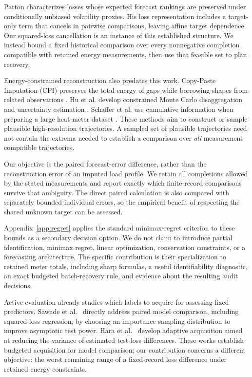 \documentclass[12pt]{article}
\begin{document}
Patton \cite{patton} characterizes losses whose expected forecast rankings
are preserved under conditionally unbiased volatility proxies. His loss
representation includes a target-only term that cancels in pairwise
comparisons, leaving affine target dependence. Our squared-loss cancellation
is an instance of this established structure. We instead bound a fixed
historical comparison over every nonnegative completion compatible with
retained energy measurements, then use that feasible set to plan recovery.

Energy-constrained reconstruction also predates this work. Copy-Paste
Imputation (CPI) preserves the total energy of gaps while borrowing shapes
from related observations \cite{cpi}. Hu et al. develop constrained Monte
Carlo disaggregation and uncertainty estimation \cite{hu}. Schaffer et al.
use cumulative information when preparing a large heat-meter dataset
\cite{heat}. These methods aim to construct or sample plausible high-resolution
trajectories. A sampled set of plausible trajectories need not contain the
extrema needed to establish a comparison over \emph{all} measurement-compatible
trajectories.

Our objective is the paired forecast-error difference, rather than the
reconstruction error of an imputed load profile. We retain all completions
allowed by the stated measurements and report exactly which finite-record
comparisons survive that ambiguity. The direct paired calculation is also
compared with separately bounded individual errors, so the empirical benefit
of respecting the shared unknown target can be assessed.

Appendix~\ref{app:regret} applies the standard minimax-regret criterion
\cite{savage,manskiregret} to these bounds as a secondary decision option.
We do not claim to introduce partial identification, minimax regret, linear
optimization, conservation constraints, or a forecasting architecture. The
specific contribution is their specialization to retained meter totals,
including sharp formulas, a useful identifiability diagnostic, an exact
budgeted batch-recovery rule, and evidence about the resulting audit decisions.

Active evaluation already studies which labels to acquire for assessing
fixed predictors. Sawade et al.\ \cite{sawade} directly address paired model
comparison, including squared-loss regression, by choosing an importance
sampling distribution to improve asymptotic test power. Hara et al.\
\cite{hara} develop adaptive acquisition aimed at reducing the variance of
estimated test-loss differences. These works establish budgeted acquisition
for model comparison; our contribution concerns a different objective:
the worst remaining range of a fixed-record loss difference under retained
energy constraints.
\end{document}
